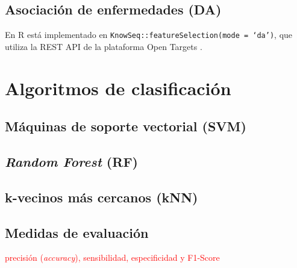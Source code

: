 \subsection{Asociación de enfermedades (DA)}

En R está implementado en \texttt{KnowSeq::featureSelection(mode = `da')}, que utiliza la REST API de la plataforma Open Targets \cite{OpenTargets2020}.

\section{Algoritmos de clasificación}

\subsection{Máquinas de soporte vectorial (SVM)}

\subsection{\textit{Random Forest} (RF)}

\subsection{k-vecinos más cercanos (kNN)}

\subsection{Medidas de evaluación}

\textcolor{red}{precisión (\textit{accuracy}), sensibilidad, especificidad y F1-Score}
